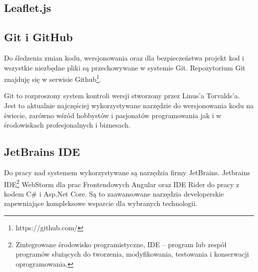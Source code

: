 \subsection{Leaflet.js}

\subsection{Git i GitHub}

Do śledzenia zmian kodu, wersjonowania oraz dla bezpieczeństwa projekt kod i wszystkie niezbędne pliki są przechowywane w systemie Git. Repozytorium Git znajduję się w serwisie Github\footnote{https://github.com/}.

Git to rozproszony system kontroli wersji stworzony przez Linus'a Torvalds'a. Jest to aktualnie najczęściej wykorzystywane narzędzie do wersjonowania kodu na świecie, zarówno wśród hobbystów i pasjonatów programowania jak i w środowiskach profesjonalnych i biznesach.

\subsection{JetBrains IDE}

Do pracy nad systemem wykorzystywane są narzędzia firmy JetBrains. Jetbrains IDE\footnote{Zintegrowane środowisko programistyczne, IDE – program lub zespół programów służących do tworzenia, modyfikowania, testowania i konserwacji oprogramowania.\cite{wikipedia.pl}} WebStorm dla prac Frontendowych Angular oraz IDE Rider do pracy z kodem C# i Asp.Net Core. Są to zaawansowane narzędzia developerskie zapewniające kompleksowe wsparcie dla wybranych technologii.